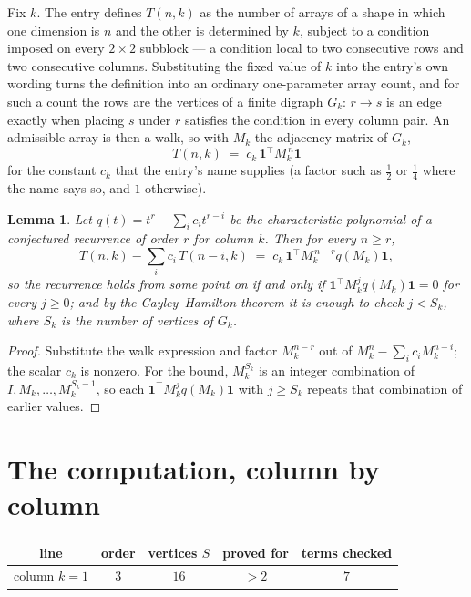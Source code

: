 \documentclass[11pt,a4paper]{article}
\theoremstyle{plain}
\newtheorem{lemma}[theorem]{Lemma}
\theoremstyle{definition}
\begin{document}
Fix $k$. The entry defines $T(n,k)$ as the number of arrays of a shape in which one dimension
is $n$ and the other is determined by $k$, subject to a condition imposed on every
$2\times2$ subblock --- a condition local to two consecutive rows and two consecutive columns.
Substituting the fixed value of $k$ into the entry's own wording turns the definition into an
ordinary one-parameter array count, and for such a count the rows are the vertices of a finite
digraph $G_k$: $r\to s$ is an edge exactly when placing $s$ under $r$ satisfies the condition
in every column pair. An admissible array is then a walk, so with $M_k$ the adjacency matrix
of $G_k$,
\[
T(n,k)\;=\;c_k\,\mathbf{1}^{\!\top}M_k^{\,n}\mathbf{1}
\]
for the constant $c_k$ that the entry's name supplies (a factor such as $\tfrac12$ or
$\tfrac14$ where the name says so, and $1$ otherwise).

\begin{lemma}\label{lem:crit}
Let $q(t)=t^{r}-\sum_i c_it^{r-i}$ be the characteristic polynomial of a conjectured
recurrence of order $r$ for column $k$. Then for every $n\ge r$,
\[
T(n,k)-\sum_i c_i\,T(n-i,k)\;=\;c_k\,\mathbf{1}^{\!\top}M_k^{\,n-r}q(M_k)\mathbf{1},
\]
so the recurrence holds from some point on if and only if
$\mathbf{1}^{\!\top}M_k^{j}q(M_k)\mathbf{1}=0$ for every $j\ge0$; and by the
Cayley--Hamilton theorem it is enough to check $j<S_k$, where $S_k$ is the number of vertices
of $G_k$.
\end{lemma}

\begin{proof}
Substitute the walk expression and factor $M_k^{n-r}$ out of $M_k^{n}-\sum_ic_iM_k^{n-i}$;
the scalar $c_k$ is nonzero. For the bound, $M_k^{S_k}$ is an integer combination of
$I,M_k,\dots,M_k^{S_k-1}$, so each $\mathbf{1}^{\!\top}M_k^{j}q(M_k)\mathbf{1}$ with
$j\ge S_k$ repeats that combination of earlier values.
\end{proof}

\section{The computation, column by column}

\begin{center}
\begin{tabular}{ccccc}
line & order & vertices $S$ & proved for & terms checked \\ \hline
column $k$$=1$ & $3$ & $16$ & $>2$ & $7$ \\
\end{tabular}
\end{center}
\end{document}
